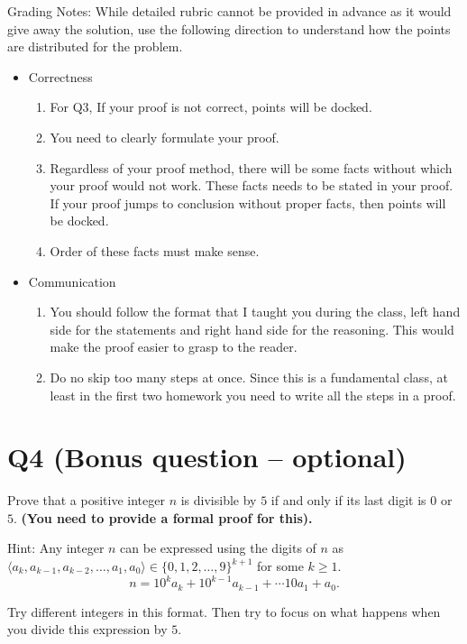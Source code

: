 \documentclass[12pt]{exam}
\begin{document}
Grading Notes:
While detailed rubric cannot be provided in advance as it would give away the solution, use the following direction to understand how the points are distributed for the problem.
\begin{itemize}
    \item Correctness
    \begin{enumerate}
        \item For Q3, If your proof is not correct, points will be docked. 
        \item You need to clearly formulate your proof.
        \item Regardless of your proof method, there will be some facts without which your proof would not work. These facts needs to be stated in your proof. If your proof jumps to conclusion without proper facts, then points will be docked.
        \item Order of these facts must make sense. 
    \end{enumerate}
        
    \item Communication 
        \begin{enumerate}
            \item You should follow the format that I taught you during the class, left hand side for the statements and right hand side for the reasoning. This would make the proof easier to grasp to the reader.
            \item Do no skip too many steps at once. Since this is a fundamental class, at least in the first two homework you need to write all the steps in a proof. 
        \end{enumerate}
         
\end{itemize}

\section{Q4 (Bonus question -- optional)} 
Prove that a positive integer $n$ is divisible by $5$ if and only if its last digit is $0$ or $5$. \textbf{(You need to provide a formal proof for this).}


Hint: Any integer $n$ can be expressed using the digits of $n$ as $\langle a_k, a_{k-1}, a_{k-2}, \ldots , a_1, a_0 \rangle \in \{0,1,2,\dots, 9\}^{k+1}$ for some $k \geq 1$.
\[ n = 10^ka_k + 10^{k-1}a_{k-1} + \cdots 10a_1 + a_0.\]

Try different integers in this format. Then try to focus on what happens when you divide this expression by $5$. 
\end{document}
